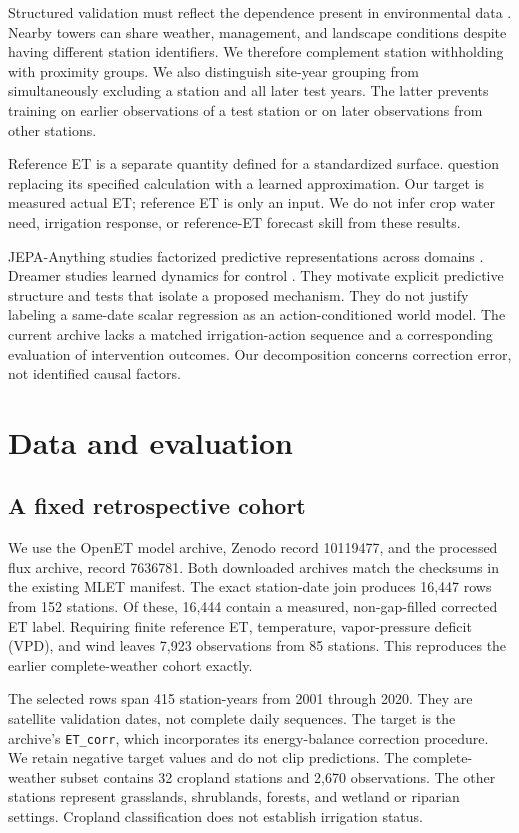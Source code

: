 \documentclass[10pt,letterpaper]{article}
\begin{document}
Structured validation must reflect the dependence present in environmental data \citep{roberts2017}.
Nearby towers can share weather, management, and landscape conditions despite having different station identifiers.
We therefore complement station withholding with proximity groups.
We also distinguish site-year grouping from simultaneously excluding a station and all later test years.
The latter prevents training on earlier observations of a test station or on later observations from other stations.

Reference ET is a separate quantity defined for a standardized surface.
\citet{kukal2026} question replacing its specified calculation with a learned approximation.
Our target is measured actual ET; reference ET is only an input.
We do not infer crop water need, irrigation response, or reference-ET forecast skill from these results.

JEPA-Anything studies factorized predictive representations across domains \citep{cui2026}.
Dreamer studies learned dynamics for control \citep{hafner2025}.
They motivate explicit predictive structure and tests that isolate a proposed mechanism.
They do not justify labeling a same-date scalar regression as an action-conditioned world model.
The current archive lacks a matched irrigation-action sequence and a corresponding evaluation of intervention outcomes.
Our decomposition concerns correction error, not identified causal factors.

\section{Data and evaluation}
\subsection{A fixed retrospective cohort}
We use the OpenET model archive, Zenodo record 10119477, and the processed flux archive, record 7636781.
Both downloaded archives match the checksums in the existing MLET manifest.
The exact station-date join produces 16,447 rows from 152 stations.
Of these, 16,444 contain a measured, non-gap-filled corrected ET label.
Requiring finite reference ET, temperature, vapor-pressure deficit (VPD), and wind leaves 7,923 observations from 85 stations.
This reproduces the earlier complete-weather cohort exactly.

The selected rows span 415 station-years from 2001 through 2020.
They are satellite validation dates, not complete daily sequences.
The target is the archive's \texttt{ET\_corr}, which incorporates its energy-balance correction procedure.
We retain negative target values and do not clip predictions.
The complete-weather subset contains 32 cropland stations and 2,670 observations.
The other stations represent grasslands, shrublands, forests, and wetland or riparian settings.
Cropland classification does not establish irrigation status.
\end{document}
